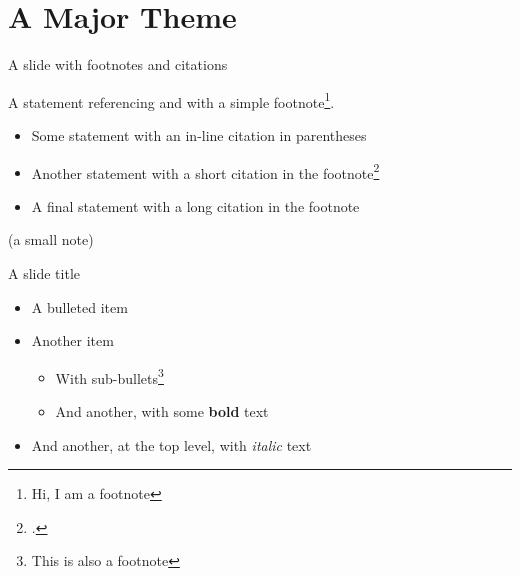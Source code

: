 \section{A Major Theme}
\begin{frame}{A slide with footnotes and citations}

A statement referencing \cite{Posmik2022} and with a simple footnote\footnote{Hi, I am a footnote}. 

  \begin{itemize}
    \item Some statement with an in-line citation in parentheses \parencite{Posmik2022} 
    \item Another statement with a short citation in the footnote\footcite{Posmik2022}
    \item A final statement with a long citation in the footnote 
	\end{itemize}

	\vspace{3ex}
	\begin{center}
		\scriptsize (a small note)
	\end{center}

\end{frame}

\begin{frame}{A slide title}

  \begin{itemize}
    \item A bulleted item
    \item Another item
      \begin{itemize}
        \item With sub-bullets\footnote{This is also a footnote}
        \item And another, with some \textbf{bold} text
      \end{itemize}
    \item And another, at the top level, with \textit{italic} text
  \end{itemize}

\end{frame}

